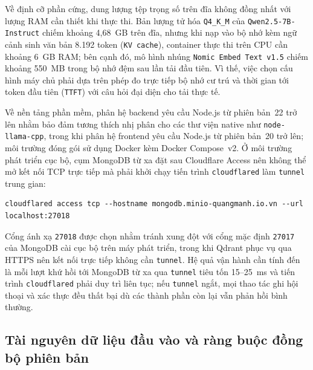 Về định cỡ phần cứng, dung lượng tệp trọng số trên đĩa không đồng nhất với lượng RAM cần thiết khi thực thi. Bản lượng tử hóa \texttt{Q4\_\allowbreak{}K\_\allowbreak{}M} của \texttt{Qwen2.5-7B-Instruct} chiếm khoảng 4,68~GB trên đĩa, nhưng khi nạp vào bộ nhớ kèm ngữ cảnh sinh văn bản 8.192 token (\texttt{KV cache}), container thực thi trên CPU cần khoảng 6~GB RAM; bên cạnh đó, mô hình nhúng \texttt{Nomic Embed Text v1.5} chiếm khoảng 550~MB trong bộ nhớ đệm sau lần tải đầu tiên. Vì thế, việc chọn cấu hình máy chủ phải dựa trên phép đo trực tiếp bộ nhớ cư trú và thời gian tới token đầu tiên (\texttt{TTFT}) với câu hỏi đại diện cho tải thực tế.

Về nền tảng phần mềm, phân hệ backend yêu cầu Node.js từ phiên bản~22 trở lên nhằm bảo đảm tương thích nhị phân cho các thư viện native như \texttt{node-\allowbreak{}llama-\allowbreak{}cpp}, trong khi phân hệ frontend yêu cầu Node.js từ phiên bản~20 trở lên; môi trường đóng gói sử dụng Docker kèm Docker Compose~v2. Ở môi trường phát triển cục bộ, cụm MongoDB từ xa đặt sau Cloudflare Access nên không thể mở kết nối TCP trực tiếp mà phải khởi chạy tiến trình \texttt{cloudflared} làm \texttt{tunnel} trung gian:

\begin{verbatim}
cloudflared access tcp --hostname mongodb.minio-quangmanh.io.vn --url localhost:27018
\end{verbatim}

Cổng ánh xạ \texttt{27018} được chọn nhằm tránh xung đột với cổng mặc định \texttt{27017} của MongoDB cài cục bộ trên máy phát triển, trong khi Qdrant phục vụ qua HTTPS nên kết nối trực tiếp không cần \texttt{tunnel}. Hệ quả vận hành cần tính đến là mỗi lượt khứ hồi tới MongoDB từ xa qua \texttt{tunnel} tiêu tốn 15--25~ms và tiến trình \texttt{cloudflared} phải duy trì liên tục; nếu \texttt{tunnel} ngắt, mọi thao tác ghi hội thoại và xác thực đều thất bại dù các thành phần còn lại vẫn phản hồi bình thường.

\subsection{Tài nguyên dữ liệu đầu vào và ràng buộc đồng bộ phiên bản}
\label{subsec:tai-nguyen-dau-vao}

